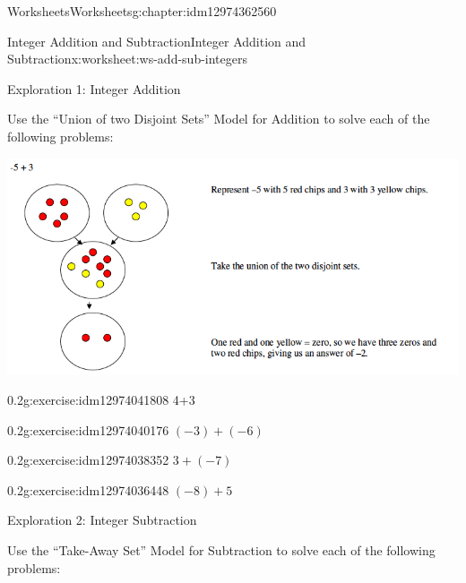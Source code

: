 \documentclass[twoside,11pt,]{book}
\begin{document}
\begin{chapterptx}{Worksheets}{}{Worksheets}{}{}{g:chapter:idm12974362560}
%
\begin{worksheet-section-numberless}{Integer Addition and Subtraction}{}{Integer Addition and Subtraction}{}{}{x:worksheet:ws-add-sub-integers}
\begin{introduction}{}%
Exploration 1: Integer Addition%
\par
Use the ``Union of two Disjoint Sets'' Model for Addition to solve each of the following problems: \begin{sidebyside}{1}{0}{0}{0}%
\begin{sbspanel}{1}%
\includegraphics[width=1\linewidth]{images/integer-add-model.png}
\end{sbspanel}%
\end{sidebyside}%
%
\end{introduction}%
\begin{divisionexercise}{1}{}{0.2}{g:exercise:idm12974041808}%
4+3%
\end{divisionexercise}%
\clearpage
\begin{divisionexercise}{2}{}{0.2}{g:exercise:idm12974040176}%
\((-3)+(-6) \)%
\end{divisionexercise}%
\begin{divisionexercise}{3}{}{0.2}{g:exercise:idm12974038352}%
\(3+(-7) \)%
\end{divisionexercise}%
\begin{divisionexercise}{4}{}{0.2}{g:exercise:idm12974036448}%
\((-8)+ 5 \)%
\end{divisionexercise}%
\clearpage
\begin{introduction}{}%
Exploration 2: Integer Subtraction%
\par
Use the ``Take-Away Set'' Model for Subtraction to solve each of the following problems: \begin{sidebyside}{1}{0}{0}{0}%
\begin{sbspanel}{1}%

\end{sbspanel}
\end{sidebyside}
\end{introduction}
\end{worksheet-section-numberless}
\end{chapterptx}
\end{document}
